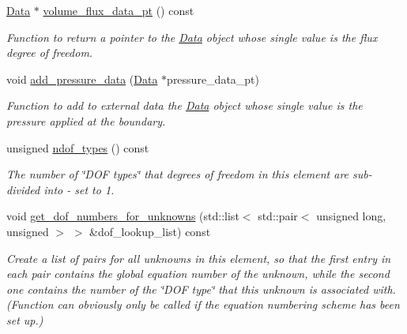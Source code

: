 \begin{DoxyCompactItemize}
\hyperlink{classoomph_1_1Data}{Data} $\ast$ \hyperlink{classoomph_1_1NavierStokesWomersleyPressureControlElement_a091e01b1894fc97c8cca758f9c6cc121}{volume\+\_\+flux\+\_\+data\+\_\+pt} () const
\begin{DoxyCompactList}\small\item\em Function to return a pointer to the \hyperlink{classoomph_1_1Data}{Data} object whose single value is the flux degree of freedom. \end{DoxyCompactList}\item 
void \hyperlink{classoomph_1_1NavierStokesWomersleyPressureControlElement_a88706386c6cbdf93ccdbf78d38424ee9}{add\+\_\+pressure\+\_\+data} (\hyperlink{classoomph_1_1Data}{Data} $\ast$pressure\+\_\+data\+\_\+pt)
\begin{DoxyCompactList}\small\item\em Function to add to external data the \hyperlink{classoomph_1_1Data}{Data} object whose single value is the pressure applied at the boundary. \end{DoxyCompactList}\item 
unsigned \hyperlink{classoomph_1_1NavierStokesWomersleyPressureControlElement_a65a9d8901d8d0690f82b873c0dafe1bd}{ndof\+\_\+types} () const
\begin{DoxyCompactList}\small\item\em The number of \char`\"{}\+D\+O\+F types\char`\"{} that degrees of freedom in this element are sub-\/divided into -\/ set to 1. \end{DoxyCompactList}\item 
void \hyperlink{classoomph_1_1NavierStokesWomersleyPressureControlElement_ac06944c7b24e71a1d9341166049fc360}{get\+\_\+dof\+\_\+numbers\+\_\+for\+\_\+unknowns} (std\+::list$<$ std\+::pair$<$ unsigned long, unsigned $>$ $>$ \&dof\+\_\+lookup\+\_\+list) const
\begin{DoxyCompactList}\small\item\em Create a list of pairs for all unknowns in this element, so that the first entry in each pair contains the global equation number of the unknown, while the second one contains the number of the \char`\"{}\+D\+O\+F type\char`\"{} that this unknown is associated with. (Function can obviously only be called if the equation numbering scheme has been set up.) \end{DoxyCompactList}\end{DoxyCompactItemize}
